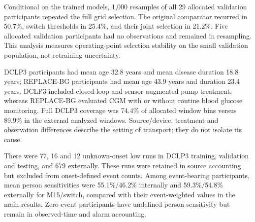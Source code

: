 \documentclass[
  american,
  11pt,
  letterpaper,
]{article}
\begin{document}
Conditional on the trained models, 1,000 resamples of all 29 allocated
validation participants repeated the full grid selection. The original
comparator recurred in 50.7\%, switch thresholds in 25.4\%, and their
joint selection in 21.2\%. Five allocated validation participants had no
observations and remained in resampling. This analysis measures
operating-point selection stability on the small validation population,
not retraining uncertainty.

DCLP3 participants had mean age 32.8 years and mean disease duration
18.8 years; REPLACE-BG participants had mean age 43.9 years and duration
23.4 years. DCLP3 included closed-loop and sensor-augmented-pump
treatment, whereas REPLACE-BG evaluated CGM with or without routine
blood glucose monitoring. Full DCLP3 coverage was 74.4\% of allocated
window bins versus 89.9\% in the external analyzed windows.
Source/device, treatment and observation differences describe the
setting of transport; they do not isolate its cause.

There were 77, 16 and 12 unknown-onset low runs in DCLP3 training,
validation and testing, and 679 externally. These runs were retained in
source accounting but excluded from onset-defined event counts. Among
event-bearing participants, mean person sensitivities were 55.1\%/46.2\%
internally and 59.3\%/54.8\% externally for M15/switch, compared with
their event-weighted values in the main results. Zero-event participants
have undefined person sensitivity but remain in observed-time and alarm
accounting.
\end{document}
